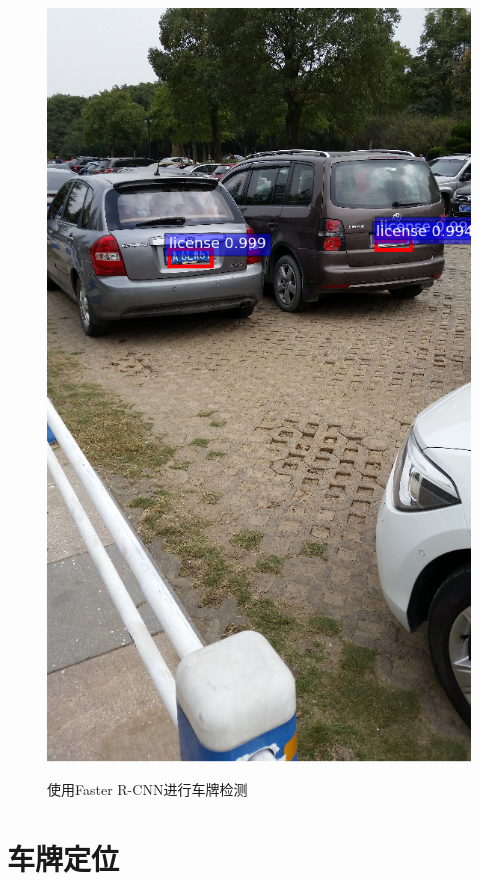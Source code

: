 \documentclass[UTF8]{beamer}
\begin{document}
\begin{frame}
\begin{figure}[th]
    {\includegraphics[height=0.6\textheight, keepaspectratio]{./Figure/DetectionDemo2.png}}
    \caption{使用Faster R-CNN进行车牌检测}\label{Fig:DetectionDemo}
  \end{figure}
\end{frame}

\part{车牌定位}
\end{document}
